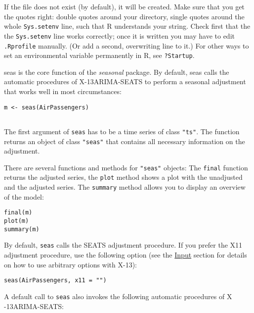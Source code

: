 If the file does not exist (by default), it will be created. Make sure
that you get the quotes right: double quotes around your directory,
single quotes around the whole \texttt{Sys.setenv} line, such that R
understands your string. Check first that the the \texttt{Sys.setenv}
line works correctly; once it is written you may have to edit
\texttt{.Rprofile} manually. (Or add a second, overwriting line to it.)
For other ways to set an environmental variable permanently in R, see
\texttt{?Startup}.


seas is the core function of the \emph{seasonal} package. By default,
seas calls the automatic procedures of X-13ARIMA-SEATS to perform a
seasonal adjustment that works well in most circumstances:

\begin{verbatim}
m <- seas(AirPassengers)
 
\end{verbatim}

The first argument of \texttt{seas} has to be a time series of class
\texttt{"ts"}. The function returns an object of class \texttt{"seas"}
that contains all necessary information on the adjustment.

There are several functions and methods for \texttt{"seas"} objects: The
\texttt{final} function returns the adjusted series, the \texttt{plot}
method shows a plot with the unadjusted and the adjusted series. The
\texttt{summary} method allows you to display an overview of the model:

\begin{verbatim}
final(m)
plot(m)
summary(m)
\end{verbatim}

By default, \texttt{seas} calls the SEATS adjustment procedure. If you
prefer the X11 adjustment procedure, use the following option (see the
\hyperref[input]{Input} section for details on how to use arbitrary
options with X-13):

\begin{verbatim}
seas(AirPassengers, x11 = "")
\end{verbatim}

A default call to \texttt{seas} also invokes the following automatic
procedures of X -13ARIMA-SEATS:


